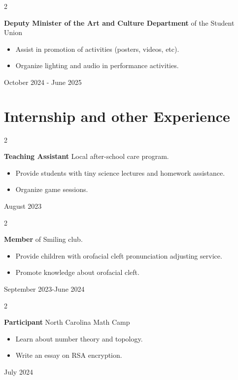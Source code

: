 \documentclass[10pt, letterpaper]{article}
\newenvironment{highlights}{
    \begin{itemize}[
        topsep=0.10 cm,
        parsep=0.10 cm,
        partopsep=0pt,
        itemsep=0pt,
        leftmargin=0.4 cm + 10pt
    ]
}{
    \end{itemize}
} %
\newenvironment{twocolentry}[2][]{
    \onecolentry
    \def\secondColumn{#2}
    \setcolumnwidth{\fill, 4.5 cm}
    \begin{paracol}{2}
}{
    \switchcolumn \raggedleft \secondColumn
    \end{paracol}
    \endonecolentry
} %
\begin{document}
    \begin{twocolentry}{ October 2024 - June 2025 }
        \textbf{Deputy Minister of the Art and Culture Department} of the Student Union

        \begin{highlights}
            \item Assist in promotion of activities (posters, videos, etc).
            \item Organize lighting and audio in performance activities.
        \end{highlights}
    \end{twocolentry}

    \section{Internship and other Experience}    
        \begin{twocolentry}{ August 2023 }
            \textbf{Teaching Assistant} Local after-school care program.

            \begin{highlights}
                \item Provide students with tiny science lectures and homework assistance.
                \item Organize game sessions.
            \end{highlights}
        \end{twocolentry}

        \begin{twocolentry}{ September 2023-June 2024}
            \textbf{Member} of Smiling club.

            \begin{highlights}
                \item Provide children with orofacial cleft pronunciation adjusting service.
                \item Promote knowledge about orofacial cleft.
            \end{highlights}
        \end{twocolentry}

        \begin{twocolentry}{ July 2024 }
            \textbf{Participant} North Carolina Math Camp

            \begin{highlights}
                \item Learn about number theory and topology.
                \item Write an essay on RSA encryption.
            \end{highlights}
        \end{twocolentry}
\end{document}
